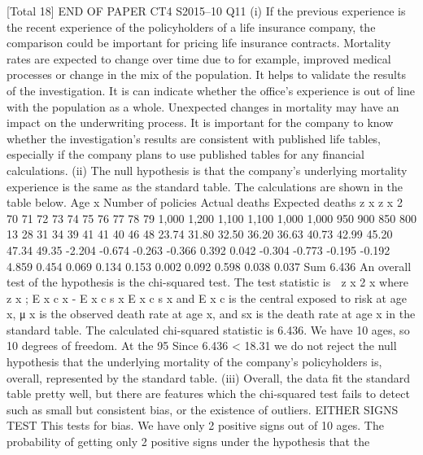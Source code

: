 \documentclass[a4paper,12pt]{article}
\begin{document}
[Total 18]
END OF PAPER
CT4 S2015–10
Q11
(i)
If the previous experience is the recent experience of the policyholders of a
life insurance company, the comparison could be important for pricing life
insurance contracts.
Mortality rates are expected to change over time due to for example, improved
medical processes or change in the mix of the population.
It helps to validate the results of the investigation.
It is can indicate whether the office’s experience is out of line with the
population as a whole.
Unexpected changes in mortality may have an impact on the underwriting
process.
It is important for the company to know whether the investigation’s results are
consistent with published life tables, especially if the company plans to use
published tables for any financial calculations.
(ii)
The null hypothesis is that the company's underlying mortality experience is
the same as the standard table.
The calculations are shown in the table below.
Age x Number of
policies Actual
deaths Expected
deaths z x z x 2
70
71
72
73
74
75
76
77
78
79 1,000
1,200
1,100
1,100
1,000
1,000
950
900
850
800 13
28
31
34
39
41
41
40
46
48 23.74
31.80
32.50
36.20
36.63
40.73
42.99
45.20
47.34
49.35 -2.204
-0.674
-0.263
-0.366
0.392
0.042
-0.304
-0.773
-0.195
-0.192 4.859
0.454
0.069
0.134
0.153
0.002
0.092
0.598
0.038
0.037
Sum
6.436
An overall test of the hypothesis is the chi-squared test.
The test statistic is
 z x 2
x
where
z x ;\+\;
E x c \mu x - E x c \mu s x
E x c \mu s x
and
E x c is the central exposed to risk at age x, μ x is the observed death rate at age
x, and \mu sx is the death rate at age x in the standard table.
The calculated chi-squared statistic is 6.436.
We have 10 ages, so 10 degrees of freedom.
At the 95%
Since 6.436 < 18.31
we do not reject the null hypothesis that the underlying mortality of the
company’s policyholders is, overall, represented by the standard table.
(iii)
Overall, the data fit the standard table pretty well, but there are features which
the chi-squared test fails to detect such as small but consistent bias, or the
existence of outliers.
EITHER SIGNS TEST
This tests for bias.
We have only 2 positive signs out of 10 ages.
The probability of getting only 2 positive signs under the hypothesis that the
\end{document}
